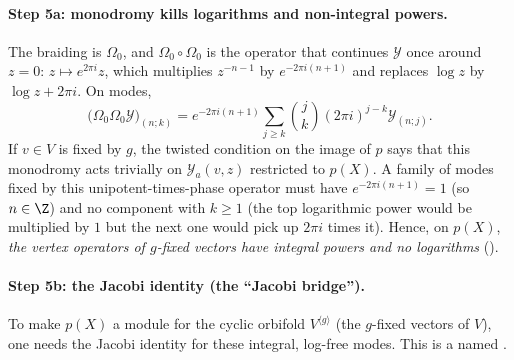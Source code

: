 \paragraph{Step 5a: monodromy kills logarithms and non-integral powers.} The braiding is $\Omega_0$, and $\Omega_0\circ\Omega_0$ is the
operator that continues $\mathcal Y$ once around $z=0$: $z\mapsto e^{2\pi i}z$, which multiplies $z^{-n-1}$ by
$e^{-2\pi i(n+1)}$ and replaces $\log z$ by $\log z+2\pi i$. On modes,
\begin{equation*}
  \big(\Omega_0\Omega_0\mathcal Y\big)_{(n;k)}=e^{-2\pi i(n+1)}\sum_{j\ge k}\binom jk(2\pi i)^{j-k}\mathcal Y_{(n;j)} .
\end{equation*}
If $v\in V$ is fixed by $g$, the twisted condition on the image of $p$ says that this monodromy acts trivially on
$\mathcal Y_a(v,z)$ restricted to $p(X)$. A family of modes fixed by this unipotent-times-phase operator must have
$e^{-2\pi i(n+1)}=1$ (so $n\in\Z$) and no component with $k\ge1$ (the top logarithmic power would be multiplied by
$1$ but the next one would pick up $2\pi i$ times it). Hence, on $p(X)$, \emph{the vertex operators of $g$-fixed vectors
have integral powers and no logarithms} ().

\paragraph{Step 5b: the Jacobi identity (the ``Jacobi bridge'').} To make $p(X)$ a module for the cyclic orbifold $V^{\langle g\rangle}$
(the $g$-fixed vectors of $V$), one needs the Jacobi identity for these integral, log-free modes. This is a named
.


